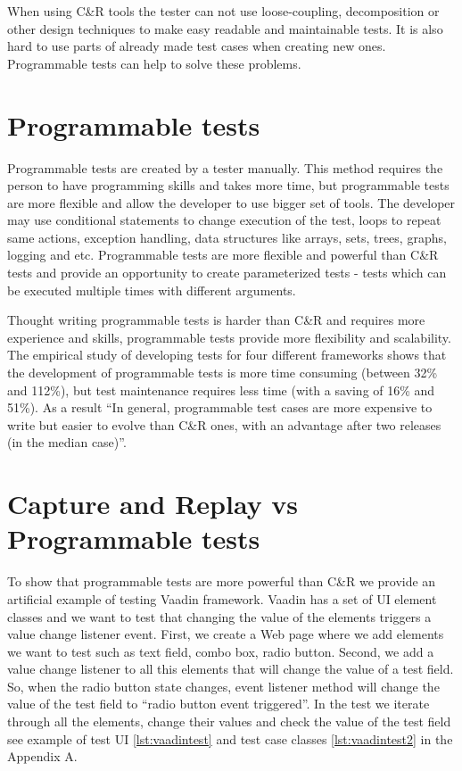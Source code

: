  When using C\&R tools the tester can
not use loose-coupling, decomposition or other design techniques to make
easy readable and maintainable tests. It is also hard to use parts of already
made test cases when creating new ones. Programmable tests can help to solve these problems.

\section{Programmable tests} 
\label{sec:programTests}
Programmable tests are created by a tester manually. This method requires the
person to have programming skills and takes more time, but programmable tests
are more flexible and allow the developer to use bigger set of tools. The
developer may use conditional statements to change execution of the test,
loops to repeat same actions, exception handling, data structures like
arrays, sets, trees, graphs, logging and etc. Programmable tests are more
flexible and powerful than C\&R tests and provide an opportunity to create
parameterized tests - tests which can be executed multiple times with different arguments. 

Thought writing programmable tests is harder than C\&R and requires more
 experience and skills, programmable tests provide more flexibility and scalability. The empirical study
       of developing tests for four different frameworks shows that the development of 
       programmable tests is more time
      consuming (between 32\% and 112\%), but test maintenance requires less
      time (with a saving of 16\% and 51\%). As a result ``In general, programmable test cases are more
      expensive to write but easier to evolve than C\&R ones, with an advantage
      after two releases (in the median case)''.\cite{CaptureReplay7}

 \section{Capture and Replay vs Programmable tests}
 To show that programmable tests are more powerful than C\&R we provide an
artificial example of testing Vaadin framework.	
Vaadin has a set of UI element classes and we want to	test that changing 
the value of the elements triggers a value change listener event.
First, we create a Web page where we add elements we
want to test such as text field, combo box, radio button. Second, we add a value
change listener to all this elements that will change the value of a test field.
So, when the radio button state changes, event listener method
will change the value of the test field to ``radio button event triggered''. In the test we
iterate through all the elements, change their values and check the value
of the test field see example of test UI \ref{lst:vaadintest} and test case
classes \ref{lst:vaadintest2} in the Appendix A.

